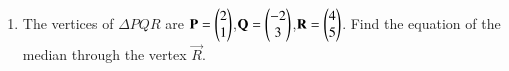 \renewcommand{\theequation}{\theenumi}
\begin{enumerate}[label=\arabic*.,ref=\thesubsection.\theenumi]
\item The vertices of $\Delta PQR$ are 
$\mathbf P = \begin{pmatrix}2\\1\end{pmatrix}$,$\mathbf Q = \begin{pmatrix}-2\\3\end{pmatrix}$,$\mathbf R = \begin{pmatrix}4\\5\end{pmatrix}$. Find the equation of the median  through the vertex $\vec R$.
\end{enumerate}